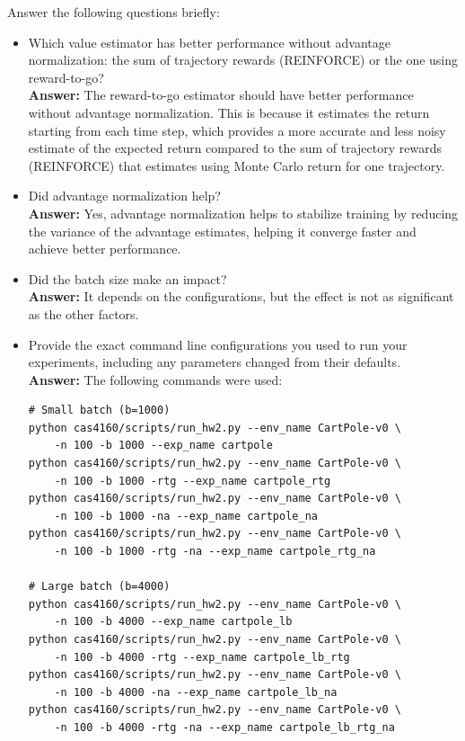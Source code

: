 \documentclass{article}
\begin{document}
Answer the following questions briefly:
\begin{itemize}
    \item Which value estimator has better performance without advantage normalization: the sum of trajectory rewards (REINFORCE) or the one using reward-to-go? \\
    \textbf{Answer:} The reward-to-go estimator should have better performance without advantage normalization. This is because it estimates the return starting from each time step, which provides a more accurate and less noisy estimate of the expected return compared to the sum of trajectory rewards (REINFORCE) that estimates using Monte Carlo return for one trajectory. 
    \item Did advantage normalization help? \\
    \textbf{Answer:} Yes, advantage normalization helps to stabilize training by reducing the variance of the advantage estimates, helping it converge faster and achieve better performance.
    \item Did the batch size make an impact? \\
    \textbf{Answer:} It depends on the configurations, but the effect is not as significant as the other factors. 
    \item Provide the exact command line configurations you used to run your experiments, including any parameters changed from their defaults. \\
    \textbf{Answer:} The following commands were used:
\begin{verbatim}
# Small batch (b=1000)
python cas4160/scripts/run_hw2.py --env_name CartPole-v0 \
    -n 100 -b 1000 --exp_name cartpole
python cas4160/scripts/run_hw2.py --env_name CartPole-v0 \
    -n 100 -b 1000 -rtg --exp_name cartpole_rtg
python cas4160/scripts/run_hw2.py --env_name CartPole-v0 \
    -n 100 -b 1000 -na --exp_name cartpole_na
python cas4160/scripts/run_hw2.py --env_name CartPole-v0 \
    -n 100 -b 1000 -rtg -na --exp_name cartpole_rtg_na

# Large batch (b=4000)
python cas4160/scripts/run_hw2.py --env_name CartPole-v0 \
    -n 100 -b 4000 --exp_name cartpole_lb
python cas4160/scripts/run_hw2.py --env_name CartPole-v0 \
    -n 100 -b 4000 -rtg --exp_name cartpole_lb_rtg
python cas4160/scripts/run_hw2.py --env_name CartPole-v0 \
    -n 100 -b 4000 -na --exp_name cartpole_lb_na
python cas4160/scripts/run_hw2.py --env_name CartPole-v0 \
    -n 100 -b 4000 -rtg -na --exp_name cartpole_lb_rtg_na
\end{verbatim}
\end{itemize}
\end{document}
